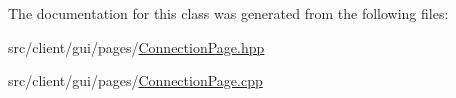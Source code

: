 The documentation for this class was generated from the following files\+:\begin{DoxyCompactItemize}
\item 
src/client/gui/pages/\mbox{\hyperlink{_connection_page_8hpp}{Connection\+Page.\+hpp}}\item 
src/client/gui/pages/\mbox{\hyperlink{_connection_page_8cpp}{Connection\+Page.\+cpp}}\end{DoxyCompactItemize}
